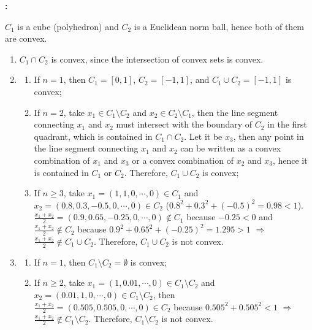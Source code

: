 \documentclass[11pt,letter,notitlepage]{article}
\theoremstyle{definition}
\begin{document}
\begin{solution}\textbf{:}

\noindent $C_1$ is a cube (polyhedron) and $C_2$ is a Euclidean norm ball, hence both of them are convex.
\begin{enumerate}
    \item[(a)] $C_1 \cap C_2$ is convex, since the intersection of convex sets is convex.
    \item[(b)]
    \begin{enumerate}
        \item[\ding{172}] If $n=1$, then $C_1 = [0,1]$, $C_2 = [-1,1]$, and $C_1 \cup C_2 = [-1,1]$ is convex;
        \item[\ding{173}] If $n=2$, take $x_1 \in C_1 \setminus C_2$ and $x_2 \in C_2 \setminus C_1$, then the line segment connecting $x_1$ and $x_2$ must intersect with the boundary of $C_2$ in the first quadrant, which is contained in $C_1 \cap C_2$. Let it be $x_3$, then any point in the line segment connecting $x_1$ and $x_2$ can be written as a convex combination of $x_1$ and $x_3$ or a convex combination of $x_2$ and $x_3$, hence it is contained in $C_1$ or $C_2$. Therefore, $C_1 \cup C_2$ is convex;
        \item[\ding{174}] If $n \geq 3$, take $x_1 = (1,1,0,\cdots,0) \in C_1$ and $x_2 = (0.8,0.3,-0.5,0,\cdots,0) \in C_2$ ($0.8^2 + 0.3^2 + (-0.5)^2 = 0.98 < 1$). $\frac{x_1 + x_2}{2} = (0.9,0.65,-0.25,0,\cdots,0) \not\in C_1$ because $-0.25 < 0$ and $\frac{x_1 + x_2}{2} \not\in C_2$ because $0.9^2 + 0.65^2 + (-0.25)^2 = 1.295 > 1$ $\Longrightarrow$ $\frac{x_1 + x_2}{2} \not\in C_1 \cup C_2$. Therefore, $C_1 \cup C_2$ is not convex.
    \end{enumerate}
    \item[(c)]
    \begin{enumerate}
        \item[\ding{172}] If $n=1$, then $C_1 \setminus C_2 = \emptyset$ is convex;
        \item[\ding{173}] If $n \geq 2$, take $x_1 = (1,0.01,\cdots,0) \in C_1 \setminus C_2$ and $x_2 = (0.01,1,0,\cdots,0) \in C_1 \setminus C_2$, then $\frac{x_1 + x_2}{2} = (0.505,0.505,0,\cdots,0) \in C_2$ because $0.505^2 + 0.505^2 < 1$ $\Longrightarrow$ $\frac{x_1 + x_2}{2} \not\in C_1 \setminus C_2$. Therefore, $C_1 \setminus C_2$ is not convex.
    \end{enumerate}
\end{enumerate}
\end{solution}
\end{document}
